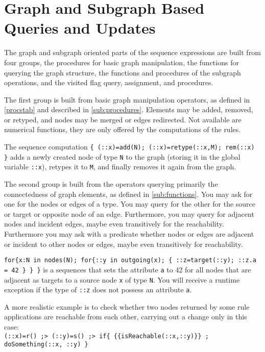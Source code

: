\section{Graph and Subgraph Based Queries and Updates}\label{sec:queryupdate}\label{sec:visited}

The graph and subgraph oriented parts of the sequence expressions are built from four groups,
the procedures for basic graph manipulation, the functions for querying the graph structure, the functions and procedures of the subgraph operations, and the visited flag query, assignment, and procedures.

The first group is built from basic graph manipulation operators, as defined in \ref{procstab} and described in \ref{sub:procedures}.
Elements may be added, removed, or retyped, and nodes may be merged or edges redirected.
Not available are numerical functions, they are only offered by the computations of the rules. 

\begin{example}
The sequence computation \verb#{ (::x)=add(N); (::x)=retype(::x,M); rem(::x) }# adds a newly created node of type \texttt{N} to the graph (storing it in the global variable \verb#::x#), retypes it to \texttt{M}, and finally removes it again from the graph.
\end{example}

The second group is built from the operators querying primarily the connectedness of graph elements,
as defined in \ref{sub:functions}.
You may ask for one for the nodes or edges of a type.
You may query for the other for the source or target or opposite node of an edge.
Furthermore, you may query for adjacent nodes and incident edges,
maybe even transitively for the reachability.
Furthermore you may ask with a predicate whether nodes or edges are adjacent or incident to other nodes or edges, maybe even transitively for reachability.

\begin{example}
\verb#for{x:N in nodes(N); for{::y in outgoing(x); { ::z=target(::y); ::z.a = 42 } } }# 
is a sequences that sets the attribute \texttt{a} to 42 for all nodes that are adjacent as targets to a source node \texttt{x} of type \texttt{N}.
You will receive a runtime exception if the type of \verb#::z# does not possess an attribute \texttt{a}.

A more realistic example is to check whether two nodes returned by some rule applications are reachable from each other, carrying out a change only in this case:\\
\verb#(::x)=r() ;> (::y)=s() ;> if{ {{isReachable(::x,::y)}} ; doSomething(::x, ::y) }#
\end{example}

